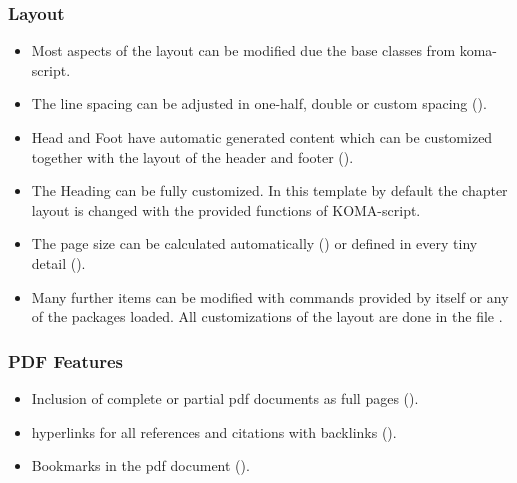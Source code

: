 \subsubsection*{Layout}
\begin{itemize}
\item Most aspects of the layout can be modified due the base classes from koma-script. 
%
\item The line spacing can be adjusted in one-half, double or custom spacing ().
%
\item Head and Foot have automatic generated content which can be customized together with the layout of the header and footer ().
%
\item The Heading can be fully customized. In this template by default the chapter layout is changed with the provided functions of KOMA-script.
%
\item The page size can be calculated automatically () or defined in every tiny detail ().
%
\item Many further items can be modified with commands provided by \latex itself or any of the packages loaded. All customizations of the layout are done in the file .
\end{itemize}

\subsubsection*{PDF Features}
\begin{itemize}
\item Inclusion of complete or partial pdf documents as full pages ().
%
\item hyperlinks for all references and citations with backlinks ().
%
\item Bookmarks in the pdf document ().
\end{itemize}

